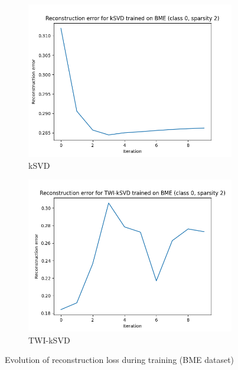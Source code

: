 \documentclass[10pt,twocolumn,letterpaper]{article}
\begin{document}
\begin{figure}
    \centering
    \begin{subfigure}[b]{0.49\textwidth}
      \includegraphics[width=\textwidth]{../../figures/loss_kSVD_spars_2_class_0_BME.png}
      \caption{kSVD}
    \end{subfigure}
    \begin{subfigure}[b]{0.49\textwidth}
        \includegraphics[width=\textwidth]{../../figures/loss_TWI_kSVD_spars_2_class_0_BME.png}
        \caption{TWI-kSVD}
      \end{subfigure}
    \caption{Evolution of reconstruction loss during training (BME dataset)}\label{fig:loss_BME}
\end{figure}
\end{document}

